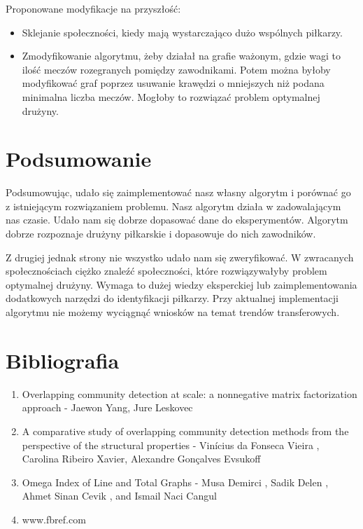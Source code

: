 \documentclass{article}
\begin{document}
Proponowane modyfikacje na przyszłość:

\begin{itemize}
    \item Sklejanie społeczności, kiedy mają wystarczająco dużo wspólnych piłkarzy.
    \item Zmodyfikowanie algorytmu, żeby działał na grafie ważonym, gdzie wagi to ilość meczów rozegranych pomiędzy zawodnikami. Potem można byłoby modyfikować graf poprzez usuwanie krawędzi o mniejszych niż podana minimalna liczba meczów. Mogłoby to rozwiązać problem optymalnej drużyny.
\end{itemize}

\section{Podsumowanie}

Podsumowując, udało się zaimplementować nasz własny algorytm i porównać go z istniejącym rozwiązaniem problemu. Nasz algorytm działa w zadowalającym nas czasie. Udało nam się dobrze dopasować dane do eksperymentów. Algorytm dobrze rozpoznaje drużyny piłkarskie i dopasowuje do nich zawodników.

Z drugiej jednak strony nie wszystko udało nam się zweryfikować. W zwracanych społecznościach ciężko znaleźć społeczności, które rozwiązywałyby problem optymalnej drużyny. Wymaga to dużej wiedzy eksperckiej lub zaimplementowania dodatkowych narzędzi do identyfikacji piłkarzy. Przy aktualnej implementacji algorytmu nie możemy wyciągnąć wniosków na temat trendów transferowych.


\section{Bibliografia}

\begin{enumerate}

    \item Overlapping community detection at scale: a nonnegative matrix factorization approach - Jaewon Yang, Jure Leskovec
    \item A comparative study of overlapping
community detection methods from the
perspective of the structural properties - Vinícius da Fonseca Vieira , Carolina Ribeiro Xavier, Alexandre Gonçalves Evsukoff
    \item Omega Index of Line and Total Graphs - Musa Demirci , Sadik Delen , Ahmet Sinan Cevik , and Ismail Naci Cangul
    \item www.fbref.com
\end{enumerate}
\end{document}
